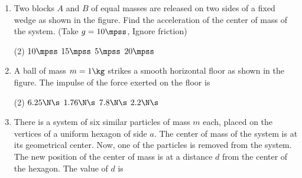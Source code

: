 \documentclass{article}
\renewcommand{\ans}{\quad}
\begin{document}
\begin{enumerate}
    \item  Two blocks $A$ and $B$ of equal masses are released on two sides of a fixed wedge as shown in the figure. Find the acceleration  of the center of mass of the system. (Take $g=10\mpss$, Ignore friction) 
    \begin{center}
    \end{center}
    \begin{tasks}(2)
        \task $10\mpss$
        \task $15\mpss$
        \task $5\mpss$\ans
        \task $20\mpss$
    \end{tasks}

    \item A ball of mass $m=1\kg$ strikes a smooth horizontal floor as shown in the figure. The impulse of the force exerted on the floor is
    \begin{center}
    \end{center}
    \begin{tasks}(2)
        \task $6.25\N\s$\ans
        \task $1.76\N\s$
        \task $7.8\N\s$
        \task $2.2\N\s$
    \end{tasks}

    \item There is a system of six similar particles of mass $m$ each, placed on the vertices of a uniform hexagon of side $a$. The center of mass of the system is at its geometrical center. Now, one of the particles is removed from the system. The new position of the center of mass is at a distance $d$ from the center of the hexagon. The value of $d$ is
    \begin{center}
    \end{center}


\end{enumerate}
\end{document}
